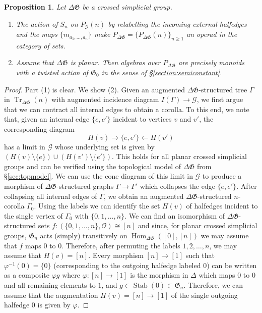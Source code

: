 \documentclass[english,11pt,leqno]{article}
\def\Gen{\mathfrak{G}}
\def\Gc{\mathcal{G}}
\def\Hom{\operatorname{Hom}}
\def\on{\operatorname}
\def\lra{\longrightarrow}
\def\lla{\longleftarrow}
\def\Hom{\operatorname{Hom}}
\def\O{{\mathcal O}}
\def\Tr{\on{Tr}}
\def\G{ {\mathcal G}}
\def\DG{ {\Delta \Gen}}
\newtheorem{prop}[thm]{Proposition}
\theoremstyle{definition}
\theoremstyle{remark}
\numberwithin{equation}{section}
\begin{document}
\begin{prop} \label{prop:Gc-operad} Let $\DG$ be a crossed simplicial group.
\begin{enumerate}
	\item The action of $S_n$ on $P_\Gc(n)$ by relabelling the incoming external halfedges and
		the maps $\{ m_{a_1, \dots, a_n} \}$ make $P_\DG= \{P_\DG(n)\}_{n\geq 1}$ an operad in the
		category of sets. 
	\item Assume that $\DG$ is planar. Then algebras over $P_\DG$ are precisely monoids with a
		twisted action of $\Gen_0$ in the sense of \S \ref{section:semiconstant}.
\end{enumerate}
\end{prop}
\begin{proof}
	Part (1) is clear. We show (2). Given an augmented $\DG$-structured tree $\Gamma$ in
	$\Tr_{\DG}(n)$ with augmented incidence diagram $I(\Gamma) \to \G$, we first argue that we
	can contract all internal edges to obtain a corolla. To this end, we note that, given an
	internal edge $\{e,e'\}$ incident to vertices $v$ and $v'$, the corresponding diagram
	\[
		H(v) \lra \{e,e'\} \lla H(v') 
	\]
	has a limit in $\G$ whose underlying set is given by $(H(v)\setminus \{e\}) \cup (H(v')
	\setminus \{e'\})$. This holds for all planar crossed simplicial groups and can be 
	verified using the topological model of $\DG$ from \S \ref{sec:topmodel}.
	We can use the cone diagram of this limit in $\G$ to produce a morphism of
	$\DG$-structured graphs $\Gamma \to \Gamma'$ which collapses the edge $\{e,e'\}$. After
	collapsing all internal edges of $\Gamma$, we obtain an augmented $\DG$-structured 
	$n$-corolla $\Gamma_0$. Using the labels we can identify the set $H(v)$ of halfedges
	incident to the single vertex of $\Gamma_0$ with $\{0,1,\dots,n\}$. We can find an
	isomorphism of $\DG$-structured sets $f: (\{0,1,\dots,n\}, \O) \cong [n]$ and since, for planar
	crossed simplicial groups, $\Gen_n$ acts (simply) transitively on $\Hom_{\DG}([0],[n])$ we
	may assume that $f$ maps $0$ to $0$. Therefore, after permuting the labels $1,2, \dots, n$,
	we may assume that $H(v) = [n]$. Every morphism $[n] \to [1]$ such that $\varphi^{-1}(0) =
	\{0\}$ (corresponding to the outgoing halfedge labeled $0$) can be written as a composite 
	$\varphi g$ where $\varphi: [n] \to [1]$ is the morphism in $\Delta$ which maps $0$ to $0$
	and all remaining elements to $1$, and $g \in \on{Stab}(0)
	\subset \Gen_n$. Therefore, we can assume that the augmentation $H(v) = [n] \to [1]$ of the
	single outgoing halfedge $0$ is given by $\varphi$. 

\end{proof}
\end{document}
